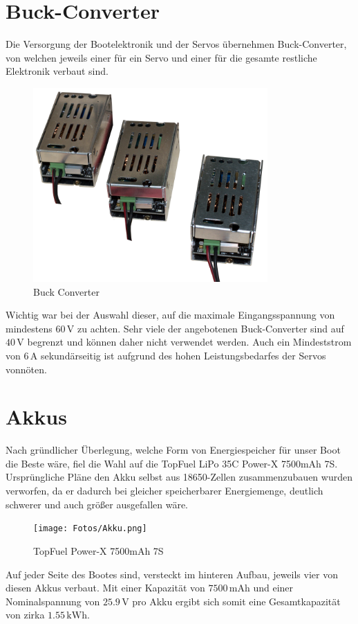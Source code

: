 \section{Buck-Converter}
Die Versorgung der Bootelektronik und der Servos übernehmen Buck-Converter, von welchen jeweils einer für ein Servo und einer für die gesamte restliche Elektronik verbaut sind.
\begin{figure}[h]
    \centering
    \includegraphics[width=0.8\textwidth]{Fotos/Buck_Converter.png}
    \caption{Buck Converter}
\end{figure}

Wichtig war bei der Auswahl dieser, auf die maximale Eingangsspannung von mindestens $60\,\mathrm{V}$ zu achten. Sehr viele der angebotenen Buck-Converter sind auf $40\,\mathrm{V}$ begrenzt und können daher nicht verwendet werden.
Auch ein Mindeststrom von $6\,\mathrm{A}$ sekundärseitig ist aufgrund des hohen Leistungsbedarfes der Servos vonnöten. 
\newpage

\section{Akkus \label{sec:Akkus}}
Nach gründlicher Überlegung, welche Form von Energiespeicher für unser Boot die Beste wäre, fiel die Wahl auf die TopFuel LiPo 35C Power-X 7500mAh 7S.
Ursprüngliche Pläne den Akku selbst aus 18650-Zellen zusammenzubauen wurden verworfen, da er dadurch bei gleicher speicherbarer Energiemenge, deutlich schwerer und auch größer ausgefallen wäre.
\begin{figure}[h]
    \centering
    \texttt{[image: Fotos/Akku.png]}
    \caption{TopFuel Power-X 7500mAh 7S}
\end{figure}

Auf jeder Seite des Bootes sind, versteckt im hinteren Aufbau, jeweils vier von diesen Akkus verbaut. Mit einer Kapazität von $7500\,\textrm{mAh}$ und einer Nominalspannung von $25.9\,\mathrm{V}$ pro Akku ergibt sich somit eine Gesamtkapazität von zirka $1.55\,\mathrm{kWh}$.

\newpage